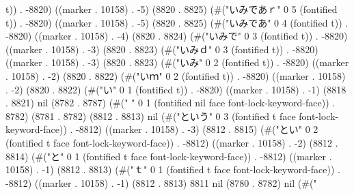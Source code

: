 {t)) . -8820) ((marker . 10158) . -5) (8820 . 8825) (#("いみであｒ" 0 5 (fontified t)) . -8820) ((marker . 10158) . -5) (8820 . 8825) (#("いみであ" 0 4 (fontified t)) . -8820) ((marker . 10158) . -4) (8820 . 8824) (#("いみで" 0 3 (fontified t)) . -8820) ((marker . 10158) . -3) (8820 . 8823) (#("いみｄ" 0 3 (fontified t)) . -8820) ((marker . 10158) . -3) (8820 . 8823) (#("いみ" 0 2 (fontified t)) . -8820) ((marker . 10158) . -2) (8820 . 8822) (#("いｍ" 0 2 (fontified t)) . -8820) ((marker . 10158) . -2) (8820 . 8822) (#("い" 0 1 (fontified t)) . -8820) ((marker . 10158) . -1) (8818 . 8821) nil (8782 . 8787) (#(" " 0 1 (fontified nil face font-lock-keyword-face)) . 8782) (8781 . 8782) (8812 . 8813) nil (#("という" 0 3 (fontified t face font-lock-keyword-face)) . -8812) ((marker . 10158) . -3) (8812 . 8815) (#("とい" 0 2 (fontified t face font-lock-keyword-face)) . -8812) ((marker . 10158) . -2) (8812 . 8814) (#("と" 0 1 (fontified t face font-lock-keyword-face)) . -8812) ((marker . 10158) . -1) (8812 . 8813) (#("ｔ" 0 1 (fontified t face font-lock-keyword-face)) . -8812) ((marker . 10158) . -1) (8812 . 8813) 8811 nil (8780 . 8782) nil (#("
}
